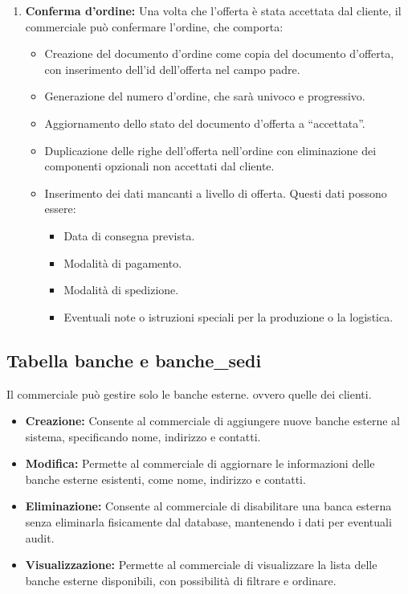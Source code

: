 \documentclass[12pt, a4paper]{article}
\begin{document}
\begin{enumerate}
    \item \textbf{Conferma d'ordine:} Una volta che l'offerta è stata accettata dal cliente, il commerciale può confermare l'ordine, che comporta:
          \begin{itemize}
              \item Creazione del documento d'ordine come copia del documento d'offerta, con inserimento dell'id dell'offerta nel campo padre.
              \item Generazione del numero d'ordine, che sarà univoco e progressivo.
              \item Aggiornamento dello stato del documento d'offerta a ``accettata''.
              \item Duplicazione delle righe dell'offerta nell'ordine con eliminazione dei componenti opzionali non accettati dal cliente.
              \item Inserimento dei dati mancanti a livello di offerta.
                    Questi dati possono essere:
                    \begin{itemize}
                        \item Data di consegna prevista.
                        \item Modalità di pagamento.
                        \item Modalità di spedizione.
                        \item Eventuali note o istruzioni speciali per la produzione o la logistica.
                    \end{itemize}
          \end{itemize}

\end{enumerate}


\subsection{Tabella banche e banche\_sedi}
Il commerciale può gestire solo le banche esterne. ovvero quelle dei clienti.
\begin{itemize}
    \item \textbf{Creazione:} Consente al commerciale di aggiungere nuove banche esterne al sistema, specificando nome, indirizzo e contatti.
    \item \textbf{Modifica:} Permette al commerciale di aggiornare le informazioni delle banche esterne esistenti, come nome, indirizzo e contatti.
    \item \textbf{Eliminazione:} Consente al commerciale di disabilitare una banca esterna senza eliminarla fisicamente dal database, mantenendo i dati per eventuali audit.
    \item \textbf{Visualizzazione:} Permette al commerciale di visualizzare la lista delle banche esterne disponibili, con possibilità di filtrare e ordinare.
\end{itemize}
\end{document}
